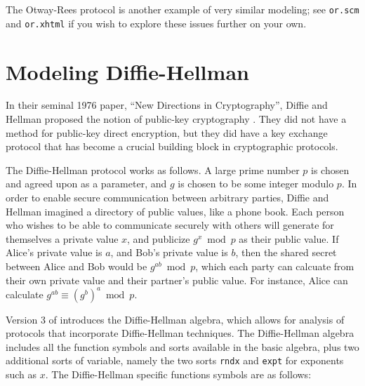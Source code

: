   The Otway-Rees
protocol is another example of very similar modeling; see
\texttt{or.scm} and \texttt{or.xhtml} if you wish to explore these
issues further on your own.

\section{Modeling Diffie-Hellman}
\label{sec:dh}

In their seminal 1976 paper, ``New Directions in Cryptography'',
Diffie and Hellman proposed the notion of public-key cryptography
\cite{DiffieHellman76}.  They did not have a method for public-key direct
encryption, but they did have a key exchange protocol that has become
a crucial building block in cryptographic protocols.

The Diffie-Hellman protocol works as follows.  A large prime number
$p$ is chosen and agreed upon as a parameter, and $g$ is chosen to be
some integer modulo $p$.  In order to enable secure communication
between arbitrary parties, Diffie and Hellman imagined a directory of
public values, like a phone book.  Each person who wishes to be able
to communicate securely with others will generate for themselves a
private value $x$, and publicize $g^x \bmod p$ as their public value.
If Alice's private value is $a$, and Bob's private value is $b$, then
the shared secret between Alice and Bob would be $g^{ab} \bmod p$,
which each party can calcuate from their own private value and their
partner's public value.  For instance, Alice can calculate $g^{ab}
\equiv (g^b)^a \bmod p$.

Version 3 of {\cpsa} introduces the Diffie-Hellman algebra, which
allows for analysis of protocols that incorporate Diffie-Hellman
techniques.  The Diffie-Hellman algebra includes all the function
symbols and sorts available in the basic algebra, plus two additional
sorts of variable, namely the two sorts \texttt{rndx} and
\texttt{expt} for exponents such as $x$.
%   
%   
The Diffie-Hellman specific functions symbols are as follows:

